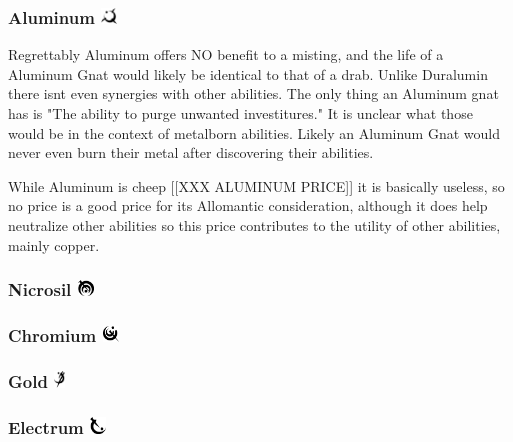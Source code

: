 \documentclass[conference]{IEEEtran}
\newcommand{\n}{\hfill\break}
\begin{document}
	\subsubsection{\textbf{Aluminum}    \includegraphics[height=1em]{images/Aluminum.png}}\label{sec:mistings:aluminum}
		Regrettably Aluminum offers NO benefit to a misting, and the life of a Aluminum Gnat would likely be identical to that of a drab.  Unlike Duralumin there isnt even synergies with other abilities.  The only thing an Aluminum gnat has is "The ability to purge unwanted investitures."  It is unclear what those would be in the context of metalborn abilities.  Likely an Aluminum Gnat would never even burn their metal after discovering their abilities.
		
		\n
		While Aluminum is cheep [[XXX ALUMINUM PRICE]] it is basically useless, so no price is a good price for its Allomantic consideration, although it does help neutralize other abilities so this price contributes to the utility of other abilities, mainly copper.
	\subsubsection{\textbf{Nicrosil}        \includegraphics[height=1em]{images/Nicrosil.png}}\label{sec:mistings:nicrosil}
	\subsubsection{\textbf{Chromium}        \includegraphics[height=1em]{images/Chromium.png}}\label{sec:mistings:chromium}
	\subsubsection{\textbf{Gold}        \includegraphics[height=1em]{images/Gold.png}}\label{sec:mistings:gold}
	\subsubsection{\textbf{Electrum}        \includegraphics[height=1em]{images/Electrum.png}}\label{sec:mistings:electrum}
\end{document}
